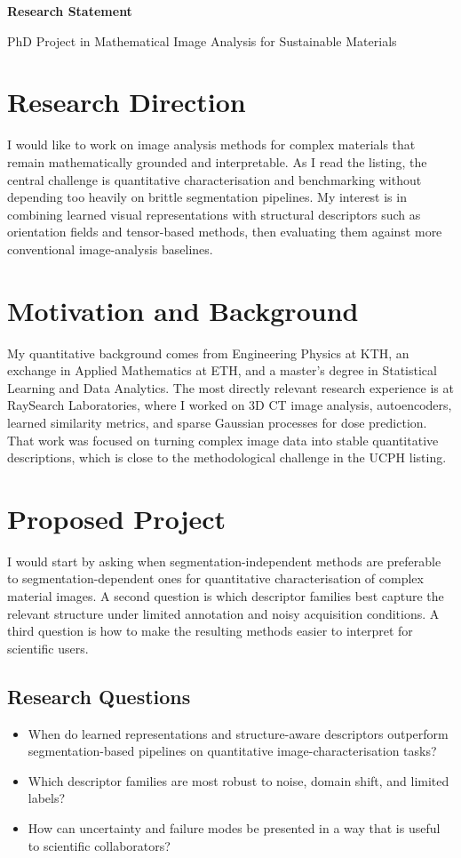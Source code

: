 \documentclass[11pt,a4paper]{article}
\newcommand{\statementtitle}[1]{%
  \begin{center}
    {\Large\bfseries #1}
  \end{center}
}
\newcommand{\statementsubtitle}[1]{%
  \begin{center}
    {\normalsize #1}
  \end{center}
  \vspace{0.5em}
}
\begin{document}
\statementtitle{Research Statement}
\statementsubtitle{PhD Project in Mathematical Image Analysis for Sustainable Materials}

\section{Research Direction}
I would like to work on image analysis methods for complex materials that remain mathematically grounded and interpretable. As I read the listing, the central challenge is quantitative characterisation and benchmarking without depending too heavily on brittle segmentation pipelines. My interest is in combining learned visual representations with structural descriptors such as orientation fields and tensor-based methods, then evaluating them against more conventional image-analysis baselines.

\section{Motivation and Background}
My quantitative background comes from Engineering Physics at KTH, an exchange in Applied Mathematics at ETH, and a master's degree in Statistical Learning and Data Analytics. The most directly relevant research experience is at RaySearch Laboratories, where I worked on 3D CT image analysis, autoencoders, learned similarity metrics, and sparse Gaussian processes for dose prediction. That work was focused on turning complex image data into stable quantitative descriptions, which is close to the methodological challenge in the UCPH listing.

\section{Proposed Project}
I would start by asking when segmentation-independent methods are preferable to segmentation-dependent ones for quantitative characterisation of complex material images. A second question is which descriptor families best capture the relevant structure under limited annotation and noisy acquisition conditions. A third question is how to make the resulting methods easier to interpret for scientific users.

\subsection{Research Questions}
\begin{itemize}
\item When do learned representations and structure-aware descriptors outperform segmentation-based pipelines on quantitative image-characterisation tasks?
    \item Which descriptor families are most robust to noise, domain shift, and limited labels?
    \item How can uncertainty and failure modes be presented in a way that is useful to scientific collaborators?
\end{itemize}
\end{document}
